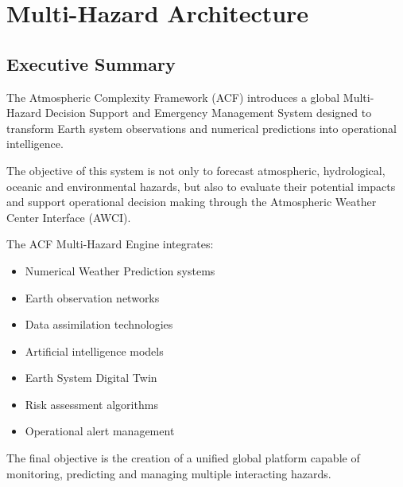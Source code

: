 
\section{Multi-Hazard Architecture}

\subsection{Executive Summary}

The Atmospheric Complexity Framework (ACF) introduces a global
Multi-Hazard Decision Support and Emergency Management System designed
to transform Earth system observations and numerical predictions into
operational intelligence.

The objective of this system is not only to forecast atmospheric,
hydrological, oceanic and environmental hazards, but also to evaluate
their potential impacts and support operational decision making through
the Atmospheric Weather Center Interface (AWCI).

The ACF Multi-Hazard Engine integrates:

\begin{itemize}

\item Numerical Weather Prediction systems

\item Earth observation networks

\item Data assimilation technologies

\item Artificial intelligence models

\item Earth System Digital Twin

\item Risk assessment algorithms

\item Operational alert management

\end{itemize}

The final objective is the creation of a unified global platform capable
of monitoring, predicting and managing multiple interacting hazards.

